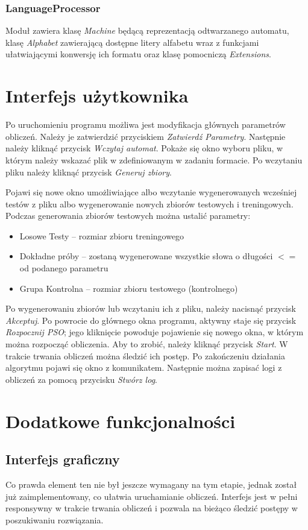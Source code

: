 \documentclass{../llncs_template/llncs}
\begin{document}
\subsubsection*{LanguageProcessor}
Moduł zawiera klasę \emph{Machine} będącą reprezentacją odtwarzanego automatu, klasę \emph{Alphabet} zawierającą dostępne litery alfabetu wraz z funkcjami ułatwiającymi konwersję ich formatu oraz klasę pomocniczą \emph{Extensions}.

\section{Interfejs użytkownika}
Po uruchomieniu programu możliwa jest modyfikacja głównych parametrów obliczeń. Należy je zatwierdzić przyciskiem \emph{Zatwierdź Parametry}. Następnie należy kliknąć przycisk \emph{Wczytaj automat}. Pokaże się okno wyboru pliku, w którym należy wskazać plik w zdefiniowanym w zadaniu formacie. Po wczytaniu pliku należy kliknąć przycisk \emph{Generuj zbiory}.

Pojawi się nowe okno umożliwiające albo wczytanie wygenerowanych wcześniej testów z pliku albo wygenerowanie nowych zbiorów testowych i treningowych. Podczas generowania zbiorów testowych można ustalić parametry: 
\begin{itemize}
\item Losowe Testy -- rozmiar zbioru treningowego
\item Dokładne próby -- zostaną wygenerowane wszystkie słowa o długości $<=$ od podanego parametru
\item Grupa Kontrolna -- rozmiar zbioru testowego (kontrolnego)
\end{itemize}

Po wygenerowaniu zbiorów lub wczytaniu ich z pliku, należy nacisnąć przycisk \emph{Akceptuj}. Po powrocie do głównego okna programu, aktywny staje się przycisk \emph{Rozpocznij PSO}; jego kliknięcie powoduje pojawienie się nowego okna, w którym można rozpocząć obliczenia. Aby to zrobić, należy kliknąć przycisk \emph{Start}. W trakcie trwania obliczeń można śledzić ich postęp. Po zakończeniu działania algorytmu pojawi się okno z komunikatem. Następnie można zapisać logi z obliczeń za pomocą przycisku \emph{Stwórz log}.

\section{Dodatkowe funkcjonalności}

\subsection{Interfejs graficzny}
Co prawda element ten nie był jeszcze wymagany na tym etapie, jednak został już zaimplementowany, co ułatwia uruchamianie obliczeń. Interfejs jest w pełni responsywny w trakcie trwania obliczeń i pozwala na bieżąco śledzić postępy w poszukiwaniu rozwiązania.
\end{document}
